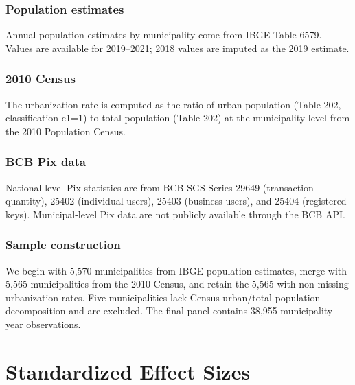 \documentclass[12pt]{article}
\begin{document}
\subsubsection*{Population estimates} Annual population estimates by municipality come from IBGE Table 6579. Values are available for 2019--2021; 2018 values are imputed as the 2019 estimate.

\subsubsection*{2010 Census} The urbanization rate is computed as the ratio of urban population (Table 202, classification c1=1) to total population (Table 202) at the municipality level from the 2010 Population Census.

\subsubsection*{BCB Pix data} National-level Pix statistics are from BCB SGS Series 29649 (transaction quantity), 25402 (individual users), 25403 (business users), and 25404 (registered keys). Municipal-level Pix data are not publicly available through the BCB API.

\subsubsection*{Sample construction} We begin with 5,570 municipalities from IBGE population estimates, merge with 5,565 municipalities from the 2010 Census, and retain the 5,565 with non-missing urbanization rates. Five municipalities lack Census urban/total population decomposition and are excluded. The final panel contains 38,955 municipality-year observations.

\section{Standardized Effect Sizes}
\label{sec:sde}


\end{document}
